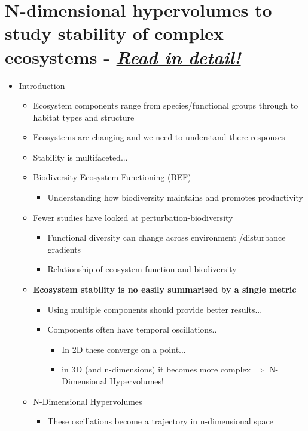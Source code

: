 \documentclass[11pt]{article}
\begin{document}
	
	\section*{N-dimensional hypervolumes to study stability of complex ecosystems \citep{Barros2016} - \underline{\textit{Read in detail!}}}
	
	\begin{itemize}
		\item Introduction
		\begin{itemize}
			\item Ecosystem components range from species/functional groups through to habitat types and structure
			\item Ecosystems are changing and we need to understand there responses
			\item Stability is multifaceted...
			\item Biodiversity-Ecosystem Functioning (BEF)
			\begin{itemize}
				\item Understanding how biodiversity maintains and promotes productivity
			\end{itemize}
			\item Fewer studies have looked at perturbation-biodiversity
			\begin{itemize}
				\item Functional diversity can change across environment /disturbance gradients
				\item Relationship of ecosystem function and biodiversity
			\end{itemize}
			\item \textbf{Ecosystem stability is no easily summarised by a single metric}
			\begin{itemize}
				\item Using multiple components should provide better results...
				\item Components often have temporal oscillations..
				\begin{itemize}
					\item In 2D these converge on a point...
					\item in 3D (and n-dimensions) it becomes more complex $\Rightarrow$ N-Dimensional Hypervolumes!
				\end{itemize}
			\end{itemize}
			\item N-Dimensional Hypervolumes
		\begin{itemize}
			\item These oscillations become a trajectory in n-dimensional space

\end{itemize}
\end{itemize}
\end{itemize}
\end{document}

